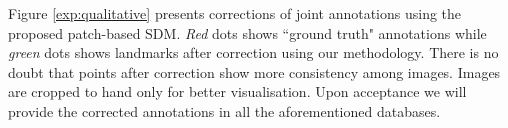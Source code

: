Figure \ref{exp:qualitative} presents corrections of joint annotations using the proposed patch-based SDM. \emph{Red} dots shows ``ground truth" annotations while \emph{green} dots shows landmarks after correction using our methodology. There is no doubt that points after correction show more consistency among images. Images are cropped to hand only for better visualisation. Upon acceptance we will provide the corrected annotations in all the aforementioned databases.


















